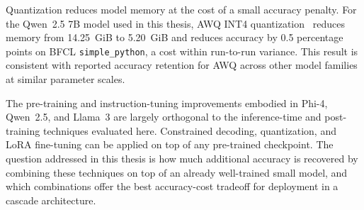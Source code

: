 Quantization reduces model memory at the cost of a small accuracy
penalty. For the Qwen~2.5 7B model used in this thesis, AWQ INT4
quantization~\cite{lin2024awq} reduces memory from 14.25~GiB to
5.20~GiB and reduces accuracy by 0.5 percentage points on BFCL
\texttt{simple\_python}, a cost within run-to-run variance. This
result is consistent with reported accuracy retention for AWQ across
other model families at similar parameter scales.

The pre-training and instruction-tuning improvements embodied in
Phi-4, Qwen~2.5, and Llama~3 are largely orthogonal to the
inference-time and post-training techniques evaluated here.
Constrained decoding, quantization, and LoRA fine-tuning can be
applied on top of any pre-trained checkpoint. The question addressed
in this thesis is how much additional accuracy is recovered by
combining these techniques on top of an already well-trained small
model, and which combinations offer the best accuracy-cost tradeoff
for deployment in a cascade architecture.
